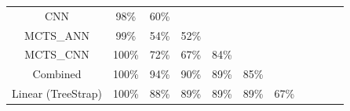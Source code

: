 \documentclass[a4paper,12pt,table]{article}
\begin{document}
\begin{table}[H]
{\begin{tabular}{|c|cccccccccc}
    CNN            & \multicolumn{1}{c|}{98\%}                       & \multicolumn{1}{c|}{60\%}                       & \cellcolor[HTML]{000000}{\color[HTML]{000000} } & \cellcolor[HTML]{000000}{\color[HTML]{333333} } & \cellcolor[HTML]{000000}                        & \cellcolor[HTML]{000000}                        & \cellcolor[HTML]{000000}                        & \cellcolor[HTML]{000000}                        & \cellcolor[HTML]{000000}                        & \cellcolor[HTML]{000000}                        \\ \cline{1-4}
    MCTS\_ANN      & \multicolumn{1}{c|}{99\%}                       & \multicolumn{1}{c|}{54\%}                       & \multicolumn{1}{c|}{52\%}                       & \cellcolor[HTML]{000000}{\color[HTML]{000000} } & \cellcolor[HTML]{000000}{\color[HTML]{000000} } & \cellcolor[HTML]{000000}{\color[HTML]{000000} } & \cellcolor[HTML]{000000}{\color[HTML]{000000} } & \cellcolor[HTML]{000000}{\color[HTML]{000000} } & \cellcolor[HTML]{000000}{\color[HTML]{000000} } & \cellcolor[HTML]{000000}{\color[HTML]{000000} } \\ \cline{1-5}
    MCTS\_CNN      & \multicolumn{1}{c|}{100\%}                      & \multicolumn{1}{c|}{72\%}                       & \multicolumn{1}{c|}{67\%}                       & \multicolumn{1}{c|}{84\%}                       & \cellcolor[HTML]{000000}                        & \cellcolor[HTML]{000000}                        & \cellcolor[HTML]{000000}                        & \cellcolor[HTML]{000000}                        & \cellcolor[HTML]{000000}                        & \cellcolor[HTML]{000000}                        \\ \cline{1-6}
    Combined        & \multicolumn{1}{c|}{100\%}                     & \multicolumn{1}{c|}{94\%}                       & \multicolumn{1}{c|}{90\%}                       & \multicolumn{1}{c|}{89\%}                       & \multicolumn{1}{c|}{85\%}                       & \cellcolor[HTML]{000000}                     & \cellcolor[HTML]{000000}                       & \cellcolor[HTML]{000000}                        & \cellcolor[HTML]{000000}                        & \cellcolor[HTML]{000000}                        \\ \cline{1-7}
    Linear (TreeStrap) & \multicolumn{1}{c|}{100\%}                    & \multicolumn{1}{c|}{88\%}                       & \multicolumn{1}{c|}{89\%}                       & \multicolumn{1}{c|}{89\%}                       & \multicolumn{1}{c|}{89\%}                       & \multicolumn{1}{c|}{67\%}                           & \cellcolor[HTML]{000000}                        & \cellcolor[HTML]{000000}                        & \cellcolor[HTML]{000000}                        & \cellcolor[HTML]{000000}                        \\ \cline{1-8}

\end{tabular}}
\end{table}
\end{document}

